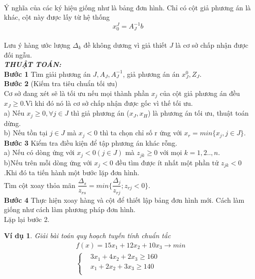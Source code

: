 \documentclass[12pt,a4paper]{report}
\newtheorem{vd}{Ví dụ}
\begin{document}
\begin{itemize}
\begin{tabular}{|c|c|c|c|c|c|c|c|c|}
    \end{tabular}\\
    Ý nghĩa của các ký hiệu giống như là bảng đơn hình. Chỉ có cột giả phương án là khác, cột này được lấy từ hệ thống \\
    $$x_0^J=A_J^{-1}b$$\\
    Lưu ý hàng ước lượng $\Delta_k$ đề không dương vì giả thiết $J$ là cơ sở chấp nhận được đối ngẫu.\\
    \textbf{\textit{THUẬT TOÁN:}}\\
    \textbf{Bước 1} Tìm giải phương án $J,A_J, A_J^{-1}$, giả phương án án $x_J^0,Z_J.$\\
    \textbf{Bước 2} (Kiếm tra tiêu chuẩn tối ưu)\\
    Cơ sở đang xét sẽ là tối ưu nếu mọi thành phần $x_j$ của cột giả phương án đều $x_J \ge 0$.Vì khi đó nó là cơ sở chấp nhận được gốc vì thế tối ưu.\\
    a) Nếu $x_j\ge 0, \forall j \in J$ thì giả phương án ($x_J,x_H$) là phương án tối ưu, thuật toán dừng.\\
    b) Nếu tồn tại $j \in J$ mà $x_j <0 $ thì ta chọn chỉ số r ứng với \textbf{$x_r=min \{x_j, j \in J\}$}.\\ 
    \textbf{Bước 3} Kiểm tra điều kiện để tập phương án khác rỗng.\\
    a) Nếu có dòng ứng với $x_j <0 (j \in J)$ mà $z_{jk}\ge 0 $ với mọi $k=1,2..,n$.\\
    b)Nếu trên mỗi dòng ứng với $x_j <0$ đều tìm được ít nhất một phần tử $z_{jk} <0$.Khi đó ta tiến hành một bước lặp đơn hình.\\
    Tìm cột xoay thỏa mãn $\dfrac{\Delta_s}{z_{rs}}=min \{\dfrac{\Delta_j}{z_{rj}}; z_{rj} <0\}$.\\
    \textbf{Bước 4} Thực hiện xoay hàng và cột để thiết lập bảng đơn hình mới. Cách làm giống như cách làm phương pháp đơn hình.\\
    Lặp lại bước 2.
    \begin{vd}
         Giải bài toán quy hoạch tuyến tính chuẩn tắc\\
    \begin{equation*}
        \begin{split}
            &f(x)=15x_1+12x_2+10x_3 \longrightarrow min\\
            & \left\{\begin{split}
                &3x_1+4x_2+2x_3 \ge 160\\
                &x_1 +2x_2 +3 x_3 \ge 140\\

\end{split}
\end{split}
\end{equation*}
\end{vd}
\end{itemize}
\end{document}
